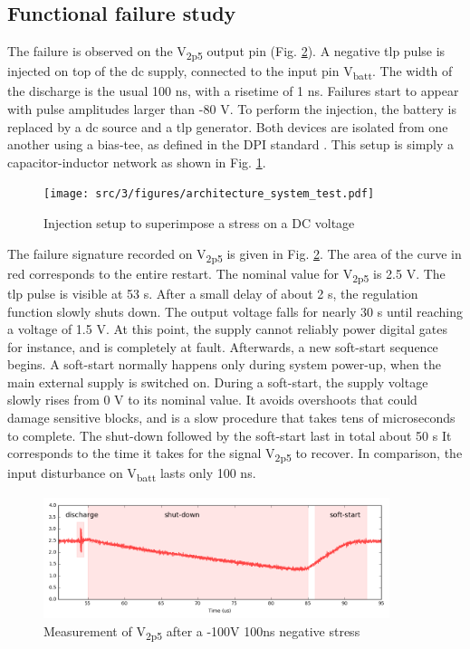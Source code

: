 \subsection{Functional failure study}
\label{sec:failure-case-study}

The failure is observed on the V\textsubscript{2p5} output pin (Fig. \ref{fig:meas-reset-v2p5}).
A negative \gls{tlp} pulse is injected on top of the \gls{dc} supply, connected to the input pin V\textsubscript{batt}.
The width of the discharge is the usual 100 ns, with a risetime of 1 ns.
Failures start to appear with pulse amplitudes larger than -80 V.
To perform the injection, the battery is replaced by a \gls{dc} source and a \gls{tlp} generator.
Both devices are isolated from one another using a \gls{bias-tee}, as defined in the DPI standard \cite{iec62132-4}.
This setup is simply a capacitor-inductor network as shown in Fig. \ref{fig:injection-setup-dpi}.

\begin{figure}[!h]
  \centering
  \texttt{[image: src/3/figures/architecture\_system\_test.pdf]}
  \caption{Injection setup to superimpose a stress on a DC voltage}
  \label{fig:injection-setup-dpi}
\end{figure}

The failure signature recorded on V\textsubscript{2p5} is given in Fig. \ref{fig:meas-reset-v2p5}.
The area of the curve in red corresponds to the entire restart.
The nominal value for V\textsubscript{2p5} is 2.5 V.
The \gls{tlp} pulse is visible at 53 \textmu{}s.
After a small delay of about 2 \textmu{}s, the regulation function slowly shuts down.
The output voltage falls for nearly 30 \textmu{}s until reaching a voltage of 1.5 V.
At this point, the supply cannot reliably power digital gates for instance, and is completely at fault.
Afterwards, a new soft-start sequence begins.
A soft-start normally happens only during system power-up, when the main external supply is switched on.
During a soft-start, the supply voltage slowly rises from 0 V to its nominal value.
It avoids overshoots that could damage sensitive blocks, and is a slow procedure that takes tens of microseconds to complete.
The shut-down followed by the soft-start last in total about 50 \textmu{}s
It corresponds to the time it takes for the signal V\textsubscript{2p5} to recover.
In comparison, the input disturbance on V\textsubscript{batt} lasts only 100 ns.

\begin{figure}[!h]
  \centering
  \includegraphics[width=0.9\textwidth]{src/3/figures/v2p5_measure.png}
  \caption{Measurement of V\textsubscript{2p5} after a -100V 100ns negative stress}
  \label{fig:meas-reset-v2p5}
\end{figure}

